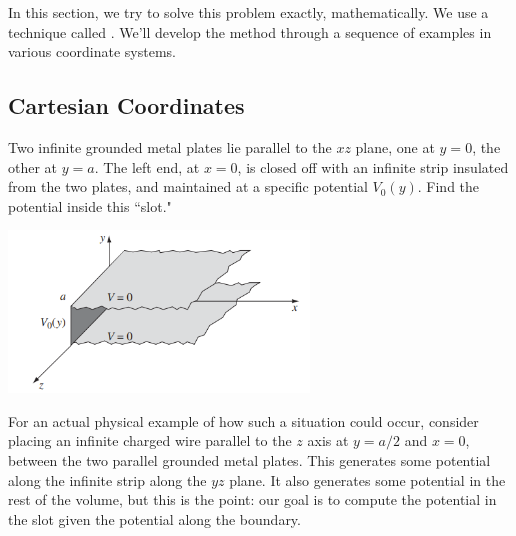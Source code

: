 In this section, we try to solve this problem exactly, mathematically. We use a technique called . We'll develop the method through a sequence of examples in various coordinate systems.

\subsection{Cartesian Coordinates}

\begin{example}
Two infinite grounded metal plates lie parallel to the $xz$ plane, one at $y=0$, the other at $y=a$. The left end, at $x=0$, is closed off with an infinite strip insulated from the two plates, and maintained at a specific potential $V_0(y)$. Find the potential inside this ``slot."
\end{example}

\begin{center}
    \includegraphics[width=8cm]{Electrodynamics/images/fig3.17.PNG}
\end{center}

\begin{remark}
For an actual physical example of how such a situation could occur, consider placing an infinite charged wire parallel to the $z$ axis at $y=a/2$ and $x=0$, between the two parallel grounded metal plates. This generates some potential along the infinite strip along the $yz$ plane. It also generates some potential in the rest of the volume, but this is the point: our goal is to compute the potential in the slot given the potential along the boundary.
\end{remark}

